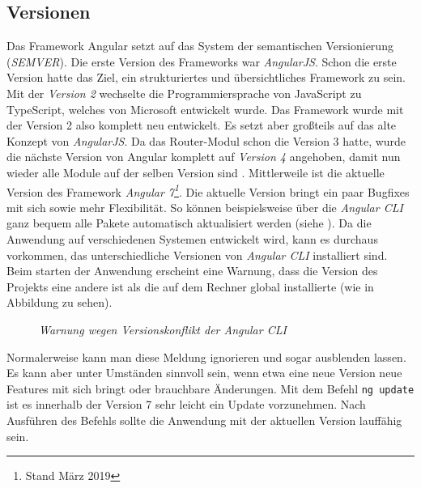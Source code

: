 \subsection{Versionen}
Das Framework Angular setzt auf das System der semantischen Versionierung (\textit{SEMVER}). Die erste Version des Frameworks war \textit{AngularJS}. Schon die erste Version hatte das Ziel, ein strukturiertes und übersichtliches Framework zu sein. Mit der \textit{Version 2} wechselte die Programmiersprache von JavaScript zu TypeScript, welches von Microsoft entwickelt wurde. Das Framework wurde mit der Version 2 also komplett neu entwickelt. Es setzt aber großteils auf das alte Konzept von \textit{AngularJS}. Da das Router-Modul schon die Version 3 hatte, wurde die nächste Version von Angular komplett auf \textit{Version 4} angehoben, damit nun wieder alle Module auf der selben Version sind \cite{bohm_robin_angular_2017}. Mittlerweile ist die aktuelle Version des Framework \textit{Angular 7\footnote{Stand März 2019}}. Die aktuelle Version bringt ein paar Bugfixes mit sich sowie mehr Flexibilität. So können beispielsweise über die \textit{Angular CLI} ganz bequem alle Pakete automatisch aktualisiert werden (siehe \cite{steyer_ruhe_2018}). Da die Anwendung auf verschiedenen Systemen entwickelt wird, kann es durchaus vorkommen, das unterschiedliche Versionen von \textit{Angular CLI} installiert sind. Beim starten der Anwendung erscheint eine Warnung, dass die Version des Projekts eine andere ist als die auf dem Rechner global installierte (wie in Abbildung zu sehen). 
%
\begin{figure}[h]
	\centering
	{}
	\caption[Angular CLI Warnung]{\textit{Warnung wegen Versionskonflikt der Angular CLI}}
	\label{fig:ngUpdate}
\end{figure} 
%
Normalerweise kann man diese Meldung ignorieren und sogar ausblenden lassen. Es kann aber unter Umständen sinnvoll sein, wenn etwa eine neue Version neue Features mit sich bringt oder brauchbare Änderungen. Mit dem Befehl \texttt{ng update} ist es innerhalb der Version 7 sehr leicht ein Update vorzunehmen. Nach Ausführen des Befehls sollte die Anwendung mit der aktuellen Version lauffähig sein.
%
%
%
%
%

